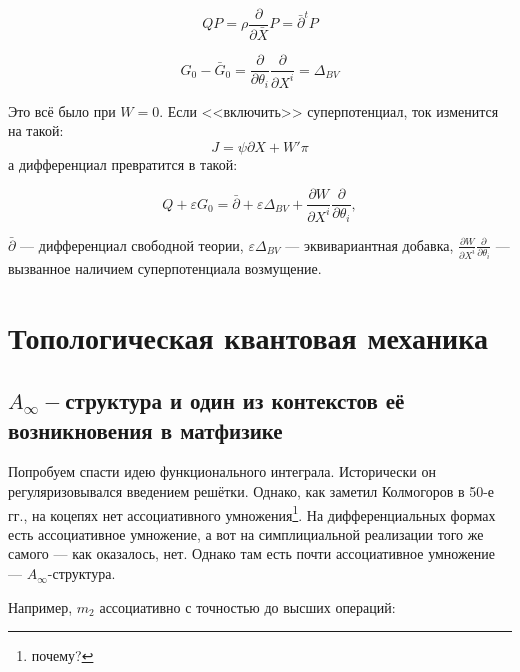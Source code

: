\documentclass[11pt]{article}
\def\p{\partial}
\theoremstyle{remark}
\theoremstyle{definition}
\newcommand{\que}[1]{\footnote{\textcolor[rgb]{0.38,0.69,0.82}{#1}}}
\begin{document}
$$QP = \rho \frac{\p}{\p \bar X} P = \bar \p^{t} P$$

$$G_0 - \bar G_0 = \frac{\p}{\p \theta_i} \frac{\p}{\p X^i} = \Delta_{BV}$$

Это всё было при $W=0$. Если <<включить>> суперпотенциал, ток изменится на такой: $$J = \psi \p X + W' \pi$$ а дифференциал превратится в такой:

$$Q + \varepsilon G_0 = \bar\p + \varepsilon \Delta_{BV} + \frac{\p W}{\p X^i} \frac{\p}{\p \theta_i},$$

$\bar\p$ --- дифференциал свободной теории, $\varepsilon \Delta_{BV}$ --- эквивариантная добавка, $\frac{\p W}{\p X^i} \frac{\p}{\p \theta_i}$ --- вызванное наличием суперпотенциала возмущение.

\section{Топологическая квантовая механика}
\subsection{$A_{\infty}-$структура и один из контекстов её возникновения в матфизике}

Попробуем спасти идею функционального интеграла. Исторически он регуляризовывался введением решётки. Однако, как заметил Колмогоров в 50-е гг.,  на коцепях нет ассоциативного умножения\que{почему?}. На дифференциальных формах есть ассоциативное умножение, а вот на симплициальной реализации того же самого --- как оказалось, нет. Однако там есть почти ассоциативное умножение --- $A_{\infty}$-структура.

Например, $m_2$ ассоциативно с точностью до высших операций:
\end{document}
